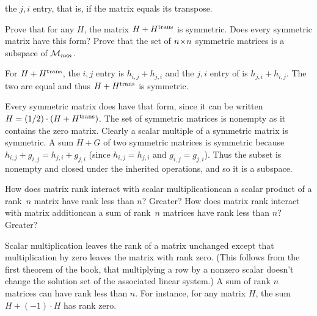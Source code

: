 \begin{exercises}
    the \( j,i \) entry, that is, if the matrix equals its transpose.
    \begin{exparts}
      \partsitem Prove that for any $H$,
        the matrix \( H+{{H}^{\rm trans}} \) is symmetric.
        Does every symmetric matrix have this form?
      \partsitem Prove that the set of \( n \! \times \! n \) symmetric matrices is
        a subspace of \( \mathcal{M}_{n \! \times \! n} \).
    \end{exparts}
    \begin{answer}  
      \begin{exparts}
        \partsitem For \( H+{{H}^{\rm trans}} \), the \( i,j \) entry 
          is \( h_{i,j}+h_{j,i} \) and
          the \( j,i \) entry of  is \( h_{j,i}+h_{i,j} \).
          The two are equal and thus \( H+{{H}^{\rm trans}} \) is symmetric.

          Every symmetric matrix does have that form, since it can be written
          \( H=(1/2)\cdot(H+{{H}^{\rm trans}}) \).
        \partsitem The set of symmetric matrices is nonempty as it
          contains the zero matrix.
          Clearly a scalar multiple of a symmetric matrix is symmetric.
          A sum \( H+G \) of two symmetric matrices is
          symmetric because \( h_{i,j}+g_{i,j}=h_{j,i}+g_{j,i} \) (since
          \( h_{i,j}=h_{j,i} \) and \( g_{i,j}=g_{j,i} \)).
          Thus the subset is nonempty and closed under the inherited
          operations, and so it is a subspace.
      \end{exparts} 
    \end{answer}
  \recommended \item 
    \begin{exparts}
      \partsitem How does matrix rank interact with 
        scalar multiplication\Dash can
        a scalar product of a rank~\( n \) matrix have rank less than \( n \)?
        Greater?
      \partsitem How does matrix rank interact with matrix 
        addition\Dash can a sum of
        rank~\( n \) matrices have rank less than \( n \)?
        Greater?
    \end{exparts}
    \begin{answer}  
      \begin{exparts}
        \partsitem Scalar multiplication leaves the rank of a matrix unchanged
          except that multiplication by zero leaves the matrix
          with rank zero.
          (This follows from the first theorem of the book, that multiplying a
          row by a nonzero 
          scalar doesn't change the solution set of the associated
          linear system.)
        \partsitem A sum of rank \( n \) matrices can have rank 
          less than \( n \).
          For instance,
          for any matrix \( H \), the sum \( H+(-1)\cdot H \) has rank zero.


\end{exparts}
\end{answer}
\end{exercises}
